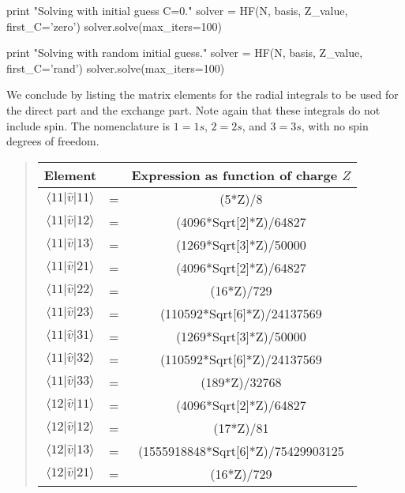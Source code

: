 \documentclass[%
oneside,                 %
final,                   %
10pt]{article}
\newenvironment{doconceexercise}{}{}
\begin{document}
\begin{doconceexercise}
print "\n\n\n Solving with initial guess C=0."
solver = HF(N, basis, Z_value, first_C='zero')
solver.solve(max_iters=100)

print "\n\n\n Solving with random initial guess."
solver = HF(N, basis, Z_value, first_C='rand')
solver.solve(max_iters=100)
\epycod



We conclude by listing the matrix elements for the radial integrals to be used for the direct part and the exchange part. Note again that these integrals do not include spin. The nomenclature is $1=1s$, $2=2s$, and $3=3s$, with no
spin degrees of freedom. 


\begin{quote}
\begin{tabular}{ccc}
\hline
\multicolumn{1}{c}{ Element } & \multicolumn{1}{c}{  } & \multicolumn{1}{c}{ Expression as function of charge $Z$ } \\
\hline
$\langle 11\vert \hat{v} \vert 11\rangle$ & = & (5*Z)/8                                \\
$\langle 11\vert \hat{v} \vert 12\rangle$ & = & (4096*Sqrt[2]*Z)/64827                 \\
$\langle 11\vert \hat{v} \vert 13\rangle$ & = & (1269*Sqrt[3]*Z)/50000                 \\
$\langle 11\vert \hat{v} \vert 21\rangle$ & = & (4096*Sqrt[2]*Z)/64827                 \\
$\langle 11\vert \hat{v} \vert 22\rangle$ & = & (16*Z)/729                             \\
$\langle 11\vert \hat{v} \vert 23\rangle$ & = & (110592*Sqrt[6]*Z)/24137569            \\
$\langle 11\vert \hat{v} \vert 31\rangle$ & = & (1269*Sqrt[3]*Z)/50000                 \\
$\langle 11\vert \hat{v} \vert 32\rangle$ & = & (110592*Sqrt[6]*Z)/24137569            \\
$\langle 11\vert \hat{v} \vert 33\rangle$ & = & (189*Z)/32768                          \\
$\langle 12\vert \hat{v} \vert 11\rangle$ & = & (4096*Sqrt[2]*Z)/64827                 \\
$\langle 12\vert \hat{v} \vert 12\rangle$ & = & (17*Z)/81                              \\
$\langle 12\vert \hat{v} \vert 13\rangle$ & = & (1555918848*Sqrt[6]*Z)/75429903125     \\
$\langle 12\vert \hat{v} \vert 21\rangle$ & = & (16*Z)/729                             \\

\end{tabular}
\end{quote}
\end{doconceexercise}
\end{document}

